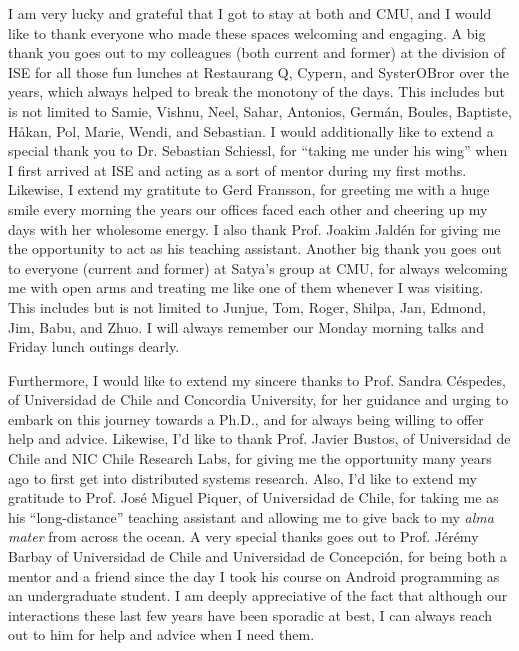 I am very lucky and grateful that I got to stay at both  and \gls{CMU}, and I would like to thank everyone who made these spaces welcoming and engaging.
A big thank you goes out to my colleagues (both current and former) at the division of \gls{ISE} for all those fun lunches at Restaurang Q, Cypern, and SysterOBror over the years, which always helped to break the monotony of the days.
This includes but is not limited to Samie, Vishnu, Neel, Sahar, Antonios, Germán, Boules, Baptiste, Håkan, Pol, Marie, Wendi, and Sebastian.
I would additionally like to extend a special thank you to Dr. Sebastian Schiessl, for ``taking me under his wing'' when I first arrived at \gls{ISE} and acting as a sort of mentor during my first moths.
Likewise, I extend my gratitute to Gerd Fransson, for greeting me with a huge smile every morning the years our offices faced each other and cheering up my days with her wholesome energy.
I also thank Prof. Joakim Jaldén for giving me the opportunity to act as his teaching assistant.
Another big thank you goes out to everyone (current and former) at Satya's group at \gls{CMU}, for always welcoming me with open arms and treating me like one of them whenever I was visiting.
This includes but is not limited to Junjue, Tom, Roger, Shilpa, Jan, Edmond, Jim, Babu, and Zhuo.
I will always remember our Monday morning talks and Friday lunch outings dearly.

Furthermore, I would like to extend my sincere thanks to Prof. Sandra Céspedes, of Universidad de Chile and Concordia University, for her guidance and urging to embark on this journey towards a Ph.D., and for always being willing to offer help and advice.
Likewise, I'd like to thank Prof. Javier Bustos, of Universidad de Chile and NIC Chile Research Labs, for giving me the opportunity many years ago to first get into distributed systems research.
Also, I'd like to extend my gratitude to Prof. José Miguel Piquer, of Universidad de Chile, for taking me as his ``long-distance'' teaching assistant and allowing me to give back to my \emph{alma mater} from across the ocean.
A very special thanks goes out to Prof. Jérémy Barbay of Universidad de Chile and Universidad de Concepción, for being both a mentor and a friend since the day I took his course on Android programming as an undergraduate student.
I am deeply appreciative of the fact that although our interactions these last few years have been sporadic at best, I can always reach out to him for help and advice when I need them.

\medskip

